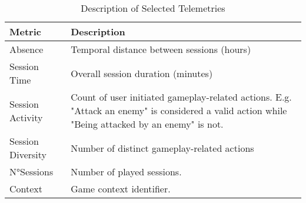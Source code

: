 \begin{table}[H] \centering
\caption{Description of Selected Telemetries}
\label{metricsdescription_1}
  \begin{tabularx}{\textwidth}{@{}lX@{}}
    \toprule
    \textbf{Metric}      & \textbf{Description}          \\ \midrule
    {Absence}    & Temporal distance between sessions (hours)  \\
    {Session Time}     & Overall session duration (minutes)       \\ 
    {Session Activity}    & Count of user initiated gameplay-related actions. E.g. "Attack an enemy" is considered a valid action while "Being attacked by an enemy" is not.\\
    {Session Diversity}      & Number of distinct gameplay-related actions  \\ 
    {N°Sessions}    & Number of played sessions.\\ 
    {Context}    &  Game context identifier.  \\
    \bottomrule
  \end{tabularx}
\end{table}